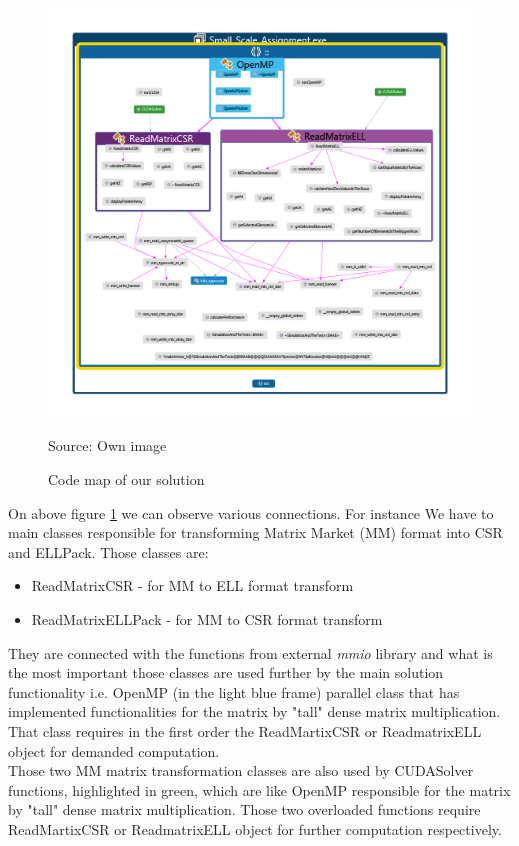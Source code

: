 \documentclass{scrreprt}
\begin{document}
\begin{figure}[h!]
\label{CodeMap}
\centering
\includegraphics{CodeMap.PNG}
\caption{Code map of our solution}
Source: Own image
\end{figure}
\FloatBarrier


On above figure \ref{CodeMap} we can observe various connections. For instance We have to main classes responsible for transforming Matrix Market (MM) format into CSR and ELLPack. Those classes are: 
\\
\begin{itemize}
\item ReadMatrixCSR - for MM to ELL format transform
\item ReadMatrixELLPack - for MM to CSR format transform
\end{itemize}

They are connected with the functions from external \textit{mmio} library and what is the most important those classes are used further by the main solution functionality i.e. OpenMP (in the light blue frame) parallel class that has implemented functionalities for the matrix by "tall" dense matrix multiplication. That class requires in the first order the ReadMartixCSR or ReadmatrixELL object for demanded computation. 
\\
Those two MM matrix transformation classes are also used by CUDASolver functions, highlighted in green, which are like OpenMP responsible for the matrix by "tall" dense matrix multiplication. Those two overloaded functions require ReadMartixCSR or ReadmatrixELL object for further computation  respectively.
\end{document}
